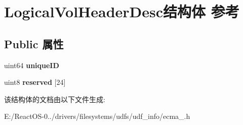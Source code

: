 \hypertarget{struct_logical_vol_header_desc}{}\section{Logical\+Vol\+Header\+Desc结构体 参考}
\label{struct_logical_vol_header_desc}
\subsection*{Public 属性}
\begin{DoxyCompactItemize}
\item 
\mbox{\label{struct_logical_vol_header_desc_ad4c29e1d90f85d1c087cf80adfffa5e3}} 
uint64 {\bfseries unique\+ID}
\item 
\mbox{\label{struct_logical_vol_header_desc_a8e44bec974c575236247087ef6838975}} 
uint8 {\bfseries reserved} \mbox{[}24\mbox{]}
\end{DoxyCompactItemize}


该结构体的文档由以下文件生成\+:\begin{DoxyCompactItemize}
\item 
E\+:/\+React\+O\+S-\/0../drivers/filesystems/udfs/udf\+\_\+info/ecma\+\_.\+h\end{DoxyCompactItemize}

